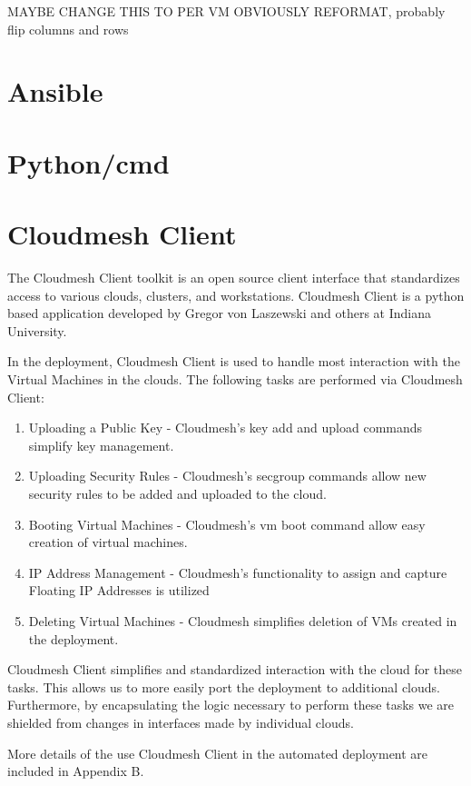 \documentclass[9pt,twocolumn,twoside]{../../styles/osajnl}
\begin{document}
MAYBE CHANGE THIS TO PER VM
OBVIOUSLY REFORMAT, probably flip columns and rows

\section{Ansible}

\section{Python/cmd}

\section{Cloudmesh Client}

The Cloudmesh Client toolkit is an open source client interface that standardizes access to various clouds, clusters, and workstations. \cite{www-cloudmesh}  Cloudmesh Client is a python based application developed by Gregor von Laszewski and others at Indiana University.

In the deployment, Cloudmesh Client is used to handle most interaction with the Virtual Machines in the clouds.  The following tasks are performed via Cloudmesh Client:

\begin{enumerate}
\item Uploading a Public Key - Cloudmesh's key add and upload commands simplify key management.
\item Uploading Security Rules - Cloudmesh's secgroup commands allow new security rules to be added and uploaded to the cloud.
\item Booting Virtual Machines - Cloudmesh's vm boot command allow easy creation of virtual machines.
\item IP Address Management - Cloudmesh's functionality to assign and capture Floating IP Addresses is utilized
\item Deleting Virtual Machines - Cloudmesh simplifies deletion of VMs created in the deployment.
\end{enumerate}

Cloudmesh Client simplifies and standardized interaction with the cloud for these tasks.  This allows us to more easily port the deployment to additional clouds.  Furthermore, by encapsulating the logic necessary to perform these tasks we are shielded from changes in interfaces made by individual clouds.

More details of the use Cloudmesh Client in the automated deployment are included in Appendix B.
\end{document}
